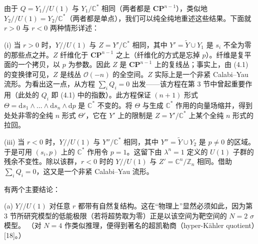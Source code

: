 由于 $Q=Y_1//U(1)$ 与 $Y_1/\mathbb{C}^*$ 相同（两者都是 $\mathbf{CP}^{n-1}$），类似地 $Y_2//U(1)=Y_2/\mathbb{C}^*$（两者都是单点），我们可以纯全纯地重述这些结果。下面就 $r>0$ 与 $r<0$ 两种情形详述：

(i) 当 $r>0$ 时，$Y//U(1)$ 与 $Z=Y'/\mathbb{C}^*$ 相同，其中 $Y'=\tilde{Y}\cup Y_1$ 是 $s_i$ 不全为零的那些点之并。$Z$ 纤维化于 $\mathbf{CP}^{n-1}$ 之上（纤维化的方式是忘掉 $p$）。纤维是复平面的一个拷贝，以 $p$ 为参数。因此 $Z$ 是 $\mathbf{CP}^{n-1}$ 上的复线丛；事实上，由 (4.1) 的变换律可见，$Z$ 是线丛 $\mathcal{O}(-n)$ 的全空间。$Z$ 实际上是一个非紧 Calabi--Yau 流形。为看出这一点，从方程 $\sum_i Q_i=0$ 出发——该方程在第 3 节中曾起重要作用（此处的 $Q_i$ 即 (4.1) 中的指数）。此方程保证 $(n+1)$ 形式 $\Theta=\mathrm{d}s_1\wedge\ldots\wedge\mathrm{d}s_n\wedge\mathrm{d}p$ 是 $\mathbb{C}^*$ 不变的。将 $\Theta$ 与生成 $\mathbb{C}^*$ 作用的向量场缩并，得到处处非零的全纯 $n$ 形式 $\Theta'$，它在 $Y'$ 上的限制是 $Z=Y'/\mathbb{C}^*$ 上某个全纯 $n$ 形式的拉回。


(iii) 当 $r<0$ 时，$Y//U(1)$ 与 $Y''/\mathbb{C}^*$ 相同，其中 $Y''=\tilde{Y}\cup Y_2$ 是 $p\neq0$ 的区域。于是可用 $(s_i,p)$ 上的 $\mathbb{C}^*$ 作用令 $p=1$。这留下由 $\lambda^n=1$ 定义的 $U(1)$ 子群的残余不变性。除以该群，$r<0$ 时的 $Y//U(1)$ 与 $Z'=\mathbb{C}^n/\mathbb{Z}_n$ 相同。借助 $\sum_i Q_i=0$，这又是一个非紧 Calabi--Yau 流形。


有两个主要结论：

(a) $Y//U(1)$ 对任意 $r$ 都带有自然复结构。这在“物理上”显然必须如此，因为第 3 节所研究模型的低能极限（若将超势取为零）正是以该空间为靶空间的 $N=2$ $\sigma$ 模型。
\label{op:48}
（对 $N=4$ 作类似推理，便得到著名的超凯勒商（hyper-Kähler quotient）[18]。）

